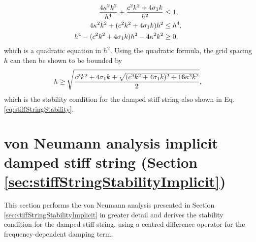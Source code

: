 \begin{align*}
    \frac{4\kappa^2k^2}{h^4}+\frac{c^2k^2 + 4\sigma_{1} k}{h^2}&\leq 1, \\
    4\kappa^2k^2+(c^2k^2+ 4\sigma_{1} k)h^2&\leq h^4,\\
    h^4- (c^2k^2+ 4\sigma_{1} k)h^2 - 4\kappa^2k^2 &\geq 0 ,
\end{align*}
which is a quadratic equation in $h^2$. Using the quadratic formula, the grid spacing $h$ can then be shown to be bounded by
\begin{equation}
    h \geq \sqrt{\frac{c^2k^2+4\sigma_{1} k + \sqrt{(c^2k^2 + 4\sigma_{1} k)^2+16\kappa^2k^2}}{2}},
\end{equation}
which is the stability condition for the damped stiff string also shown in Eq. \eqref{eq:stiffStringStability}.

\section{von Neumann analysis implicit damped stiff string (Section \ref{sec:stiffStringStabilityImplicit})}\label{app:vonNeumannStringImplicit}
This section performs the von Neumann analysis presented in Section \ref{sec:stiffStringStabilityImplicit} in greater detail and derives the stability condition for the damped stiff string, using a centred difference operator for the frequency-dependent damping term.

